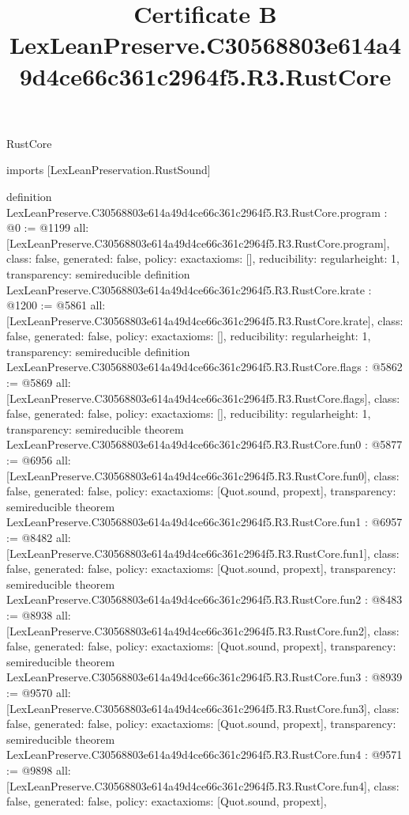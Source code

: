 \begin{lexlean}{RustCore}
\title{Certificate B LexLeanPreserve.C30568803e614a49d4ce66c361c2964f5.R3.RustCore}
\begin{coremodule}
imports [LexLeanPreservation.RustSound]

definition LexLeanPreserve.C30568803e614a49d4ce66c361c2964f5.R3.RustCore.program : @0 := @1199 {
  all: [LexLeanPreserve.C30568803e614a49d4ce66c361c2964f5.R3.RustCore.program],
  class: false,
  generated: false,
  policy: exact{axioms: []},
  reducibility: regular{height: 1},
  transparency: semireducible
}
definition LexLeanPreserve.C30568803e614a49d4ce66c361c2964f5.R3.RustCore.krate : @1200 := @5861 {
  all: [LexLeanPreserve.C30568803e614a49d4ce66c361c2964f5.R3.RustCore.krate],
  class: false,
  generated: false,
  policy: exact{axioms: []},
  reducibility: regular{height: 1},
  transparency: semireducible
}
definition LexLeanPreserve.C30568803e614a49d4ce66c361c2964f5.R3.RustCore.flags : @5862 := @5869 {
  all: [LexLeanPreserve.C30568803e614a49d4ce66c361c2964f5.R3.RustCore.flags],
  class: false,
  generated: false,
  policy: exact{axioms: []},
  reducibility: regular{height: 1},
  transparency: semireducible
}
theorem LexLeanPreserve.C30568803e614a49d4ce66c361c2964f5.R3.RustCore.fun0 : @5877 := @6956 {
  all: [LexLeanPreserve.C30568803e614a49d4ce66c361c2964f5.R3.RustCore.fun0],
  class: false,
  generated: false,
  policy: exact{axioms: [Quot.sound, propext]},
  transparency: semireducible
}
theorem LexLeanPreserve.C30568803e614a49d4ce66c361c2964f5.R3.RustCore.fun1 : @6957 := @8482 {
  all: [LexLeanPreserve.C30568803e614a49d4ce66c361c2964f5.R3.RustCore.fun1],
  class: false,
  generated: false,
  policy: exact{axioms: [Quot.sound, propext]},
  transparency: semireducible
}
theorem LexLeanPreserve.C30568803e614a49d4ce66c361c2964f5.R3.RustCore.fun2 : @8483 := @8938 {
  all: [LexLeanPreserve.C30568803e614a49d4ce66c361c2964f5.R3.RustCore.fun2],
  class: false,
  generated: false,
  policy: exact{axioms: [Quot.sound, propext]},
  transparency: semireducible
}
theorem LexLeanPreserve.C30568803e614a49d4ce66c361c2964f5.R3.RustCore.fun3 : @8939 := @9570 {
  all: [LexLeanPreserve.C30568803e614a49d4ce66c361c2964f5.R3.RustCore.fun3],
  class: false,
  generated: false,
  policy: exact{axioms: [Quot.sound, propext]},
  transparency: semireducible
}
theorem LexLeanPreserve.C30568803e614a49d4ce66c361c2964f5.R3.RustCore.fun4 : @9571 := @9898 {
  all: [LexLeanPreserve.C30568803e614a49d4ce66c361c2964f5.R3.RustCore.fun4],
  class: false,
  generated: false,
  policy: exact{axioms: [Quot.sound, propext]},
}
\end{coremodule}
\end{lexlean}
